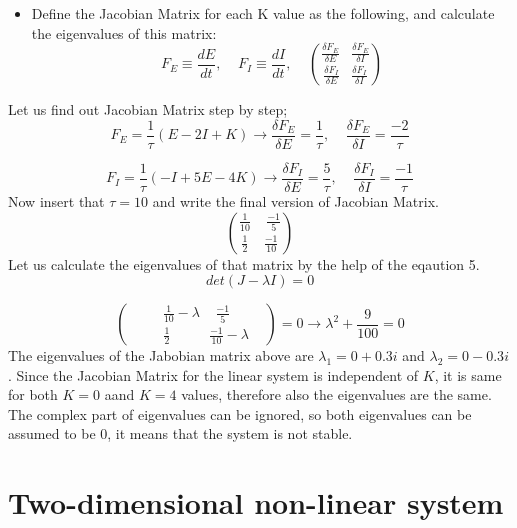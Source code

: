 \documentclass{article}
\begin{document}
\newpage

\begin{itemize}
 \item Define the Jacobian Matrix for each K value as the following, and calculate the eigenvalues of this matrix:
\begin{equation}
F_E\equiv \frac{dE}{dt}, \;\;\;\; F_I\equiv \frac{dI}{dt}, \;\;\;\;            \binom{\frac{\delta F_E}{\delta E} \;\;\; \frac{\delta F_E}{\delta I} }{\frac{\delta F_I}{\delta E} \;\;\; \frac{\delta F_I}{\delta I}}
\end{equation}
\end{itemize}
Let us find out Jacobian Matrix step by step;
\begin{equation*}
 F_E=\frac{1}{\tau}(E-2I+K)\longrightarrow \frac{\delta F_E}{\delta E}=\frac{1}{\tau}, \;\;\;\; \frac{\delta F_E}{\delta I}=\frac{-2}{\tau} 
\end{equation*}

\begin{equation*}
 F_I=\frac{1}{\tau}(-I+5E-4K)\longrightarrow \frac{\delta F_I}{\delta E}=\frac{5}{\tau}, \;\;\;\; \frac{\delta F_I}{\delta I}=\frac{-1}{\tau} 
\end{equation*}
Now insert that $\tau=10$ and write the final version of Jacobian Matrix. 
\begin{equation*}
 \binom{\frac{1}{10} \;\;\;\; \frac{-1}{5}}{\frac{1}{2} \;\;\;\; \frac{-1}{10}}
\end{equation*}
Let us calculate the eigenvalues of that matrix by the help of the eqaution 5.
\begin{equation}
 det(J-\lambda I)=0
\end{equation}

\begin{equation*}
 \binom{\frac{1}{10}-\lambda \;\;\;\; \frac{-1}{5}}{\;\;\;\;\;\;\;\;\; \frac{1}{2}\;\;\;\;\;\;\;\;\;\; \frac{-1}{10}-\lambda\;\;\;\;}=0 \longrightarrow \lambda^{2}+\frac{9}{100}=0
\end{equation*}
The eigenvalues of the Jabobian matrix above are $\lambda_1=0+0.3i$ and $\lambda_2=0-0.3i$. Since the Jacobian Matrix for the linear system is independent of $K$, it is same for both $K=0$ aand $K=4$ values, therefore also the eigenvalues are the same. The complex part of eigenvalues can be ignored, so both eigenvalues can be assumed to be 0, it means that the system is not stable. 

\section{Two-dimensional non-linear system}
\end{document}
